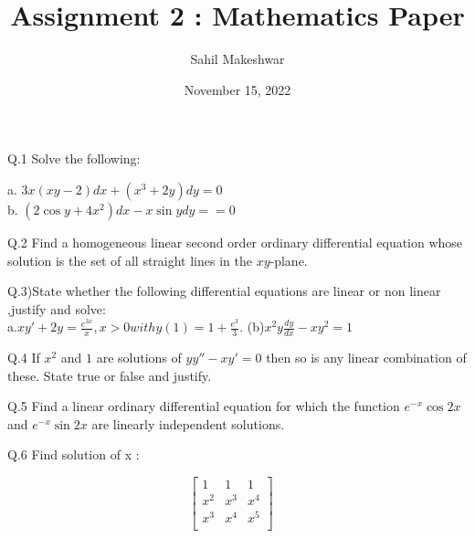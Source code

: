 \documentclass[12pt]{article}
\title{Assignment 2 : Mathematics Paper}
\author{Sahil Makeshwar}
\date{November 15, 2022}
\begin{document}
\maketitle

    
Q.1 Solve the following:

a. $3x(xy-2)dx+(x^3+2y)dy=0$
\\b. $(2\cos{y} + 4x^2)dx -x\sin{y}dy==0
$

\begin{flushleft}
 Q.2 Find a homogeneous linear second order ordinary differential equation whose solution is the set of all straight lines in the $xy$-plane.
 \end{flushleft}

 \begin{flushleft}
 Q.3)State whether the following differential equations are linear or non linear ,justify and solve:\\[10pt]
a.$xy'+2y = \frac{e^{3x}}{x}, x>0 with y(1)=1+\frac{e^3}{3}. $
(b)$x^2y\frac{dy}{dx}- xy^2 = 1$
\end{flushleft}

\begin{flushleft}
Q.4 If $x^2$ and $1$ are solutions of $yy''-xy'=0$ then so is any linear combination of these. State true or false and justify.
\end{flushleft}

\begin{flushleft}
Q.5 Find a linear ordinary differential equation for which the function $e^{-x}\cos{2x}$ and $e^{-x}\sin{2x}$ are linearly independent solutions.
\end{flushleft}

\begin{flushleft}
Q.6 Find solution of x :
\end{flushleft}
$$
	\begin{bmatrix} 
	1 & 1 & 1 \\
	x^2 & x^3 & x^4\\
	x^3 & x^4 & x^5 \\
	\end{bmatrix}
	\quad
	$$
\end{document}
